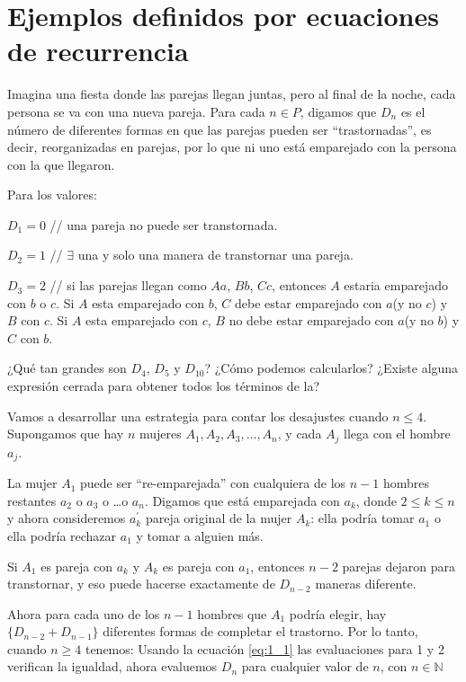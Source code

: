 \section{Ejemplos definidos por ecuaciones de recurrencia}
\begin{example}{}
Imagina una fiesta donde las parejas llegan juntas, pero al final de la noche, cada persona se va con una nueva pareja. Para cada $n\in P$, digamos que $D_{n}$ es el número de diferentes formas en que las parejas pueden ser ``trastornadas'', es decir, reorganizadas en parejas, por lo que ni uno está emparejado con la persona con la que llegaron.

Para los valores:

$D_{1} = 0$  // una pareja no puede ser transtornada.

$D_{2} = 1$  // $\exists$ una y solo una manera de transtornar una pareja.

$D_{3} = 2$  // si las parejas llegan como $Aa$, $Bb$, $Cc$, entonces $A$ estaria emparejado con $b$ o $c$. Si $A$ esta emparejado con $b$, $C$ debe estar emparejado con $a$(y no $c$) y $B$ con $c$. Si $A$ esta emparejado con $c$, $B$ no debe estar emparejado con $a$(y no $b$) y $C$ con $b$.

¿Qué tan grandes son $D_{4}$, $D_{5}$ y $D_{10}$? ¿Cómo podemos calcularlos? ¿Existe alguna expresión cerrada para obtener todos los términos de la? %

Vamos a desarrollar una estrategia para contar los desajustes cuando $n\leq4$. Supongamos que hay $n$ mujeres $A_{1},A_{2},A_{3},\ldots,A_{n}$, y cada $A_{j}$ llega con el hombre $a_{j}$.

La mujer $A_{1}$ puede ser ``re-emparejada'' con cualquiera de los $n-1$ hombres restantes $a_{2}$ o $a_{3}$ o \ldots o $a_{n}$. Digamos que está emparejada con $a_{k}$, donde $2\leq k\leq n$ y ahora consideremos $a_{k}^{\prime}$ pareja original de la mujer $A_{k}$: ella podría tomar $a_{1}$ o ella podría rechazar $a_{1}$ y tomar a alguien más.

Si $A_{1}$ es pareja con $a_{k}$ y $A_{k}$ es pareja con $a_{1}$, entonces $n-2$ parejas dejaron para transtornar, y eso puede hacerse exactamente de $D_{n-2}$ maneras diferente.

Ahora para cada uno de los $n-1$ hombres que $A_{1}$ podría elegir, hay $\{D_{n-2}+ D_{n-1}\}$ diferentes formas de completar el trastorno. Por lo tanto, cuando $n\geq 4$ tenemos:
Usando la ecuación \eqref{eq:1_1} las evaluaciones para 1 y 2 verifican la igualdad, ahora evaluemos $D_{n}$ para cualquier valor de $n$, con $n\in\mathds{N}$


\end{example}
